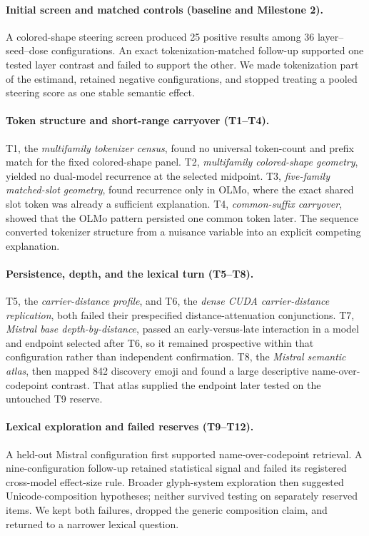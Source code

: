 \documentclass{article}
\begin{document}
\paragraph{Initial screen and matched controls (baseline and Milestone 2).}
A colored-shape steering screen produced 25 positive results among 36
layer--seed--dose configurations. An exact tokenization-matched follow-up
supported one tested layer contrast and failed to support the other. We made
tokenization part of the estimand, retained negative configurations, and
stopped treating a pooled steering score as one stable semantic effect.

\paragraph{Token structure and short-range carryover (T1--T4).}
T1, the \emph{multifamily tokenizer census}, found no universal token-count
and prefix match for the fixed colored-shape panel. T2, \emph{multifamily
colored-shape geometry}, yielded no dual-model recurrence at the selected
midpoint. T3, \emph{five-family matched-slot geometry}, found recurrence only
in OLMo, where the exact shared slot token was already a sufficient
explanation. T4, \emph{common-suffix carryover}, showed that the OLMo pattern
persisted one common token later. The sequence converted tokenizer structure
from a nuisance variable into an explicit competing explanation.

\paragraph{Persistence, depth, and the lexical turn (T5--T8).}
T5, the \emph{carrier-distance profile}, and T6, the \emph{dense CUDA
carrier-distance replication}, both failed their prespecified
distance-attenuation conjunctions. T7, \emph{Mistral base
depth-by-distance}, passed an early-versus-late interaction in a model and
endpoint selected after T6, so it remained prospective within that configuration
rather than independent confirmation. T8, the \emph{Mistral semantic atlas},
then mapped 842 discovery emoji and found a large descriptive
name-over-codepoint contrast. That atlas supplied the endpoint later tested on
the untouched T9 reserve.

\paragraph{Lexical exploration and failed reserves (T9--T12).}
A held-out Mistral configuration first supported name-over-codepoint retrieval. A
nine-configuration follow-up retained statistical signal and failed its
registered cross-model effect-size rule. Broader glyph-system exploration then suggested
Unicode-composition hypotheses; neither survived testing on separately
reserved items. We kept both failures, dropped the generic composition claim,
and returned to a narrower lexical question.
\end{document}
